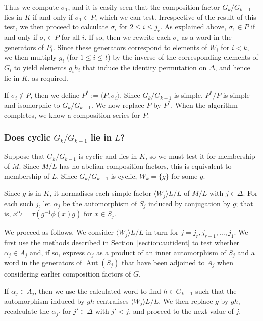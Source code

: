 \documentclass[12pt,twoside,reqno,psamsfonts]{amsproc}
\numberwithin{equation}{section}
\numberwithin{figure}{section}
\newcounter{algorithm}
\theoremstyle{plain}
\theoremstyle{definition}
\theoremstyle{remark}
\DeclareMathOperator{\Aut}{Aut}
\begin{document}
Thus we compute $\sigma_1$, and it is easily seen that the composition factor
$G_k/G_{k-1}$ lies in $K$ if and only if $\sigma_1 \in P$, which we can test.
Irrespective of the result of this test, we then proceed to 
calculate $\sigma_i$ for $2 \leqslant i \leqslant j_r$. As explained above, 
$\sigma_1 \in P$ if and only if $\sigma_i \in P$ for all $i$.
If so, then we rewrite each $\sigma_i$ as a word in the generators of $P_i$.
Since these generators correspond to elements of $W_i$ for $i<k$, we 
then multiply $g_i$ (for $1 \leqslant i \leqslant t$) by the inverse of the
corresponding elements of $G_i$ to yield elements $g_ih_i$ that induce the
identity permutation on $\Delta$, and hence lie in $K$, as required.

If $\sigma_i \not\in P$, then we 
define $P^* := \langle P, \sigma_i \rangle$.
Since $G_k/G_{k-1}$ is simple, $P^*/P$ 
is simple and isomorphic to $G_k/G_{k-1}$. 
We now replace $P$ by $P^*$.
When the algorithm completes, we know a composition series for $P$. 

\subsubsection{Does cyclic $G_k/G_{k-1}$ lie in $L$?}\label{subsection:test2}
Suppose that $G_k/G_{k-1}$ is cyclic and lies in $K$, so we must 
test it for membership of $M$. Since $M/L$ has no abelian composition
factors, this is equivalent to membership of $L$. Since $G_k/G_{k-1}$ is
cyclic, $W_k = \{g\}$ for some $g$.

Since $g$ is in $K$, it normalises each simple factor
$\langle W_j \rangle L/L$ of $M/L$ with $j \in \Delta$.  For each such $j$,
let $\alpha_j$ be the automorphism of $S_j$ induced by conjugation by $g$;
that is,  $x^{\alpha_j} = \tau(g^{-1}\phi(x)g)$ for $x \in S_j$.

We proceed as follows. We consider $\langle W_j \rangle L/L$
in turn for $j = j_r,j_{r-1},\ldots,j_1$.  We first
use the methods described in Section~\ref {section:autident} to test whether
$\alpha_j \in A_j$ and, if so, express $\alpha_j$ as a product of an inner
automorphism of $S_j$ and a word in the generators of $\Aut(S_j)$ that have
been adjoined to $A_j$ when considering earlier composition factors of $G$.

If $\alpha_j \in A_j$, then we use the calculated word to find
$h \in G_{k-1}$ such that the automorphism induced by $gh$ centralises
$\langle W_j \rangle L/L$. We then replace $g$ by $gh$, recalculate the
$\alpha_{j'}$ for $j' \in \Delta$ with $j' < j$, and proceed to the
next value of $j$.
\end{document}
